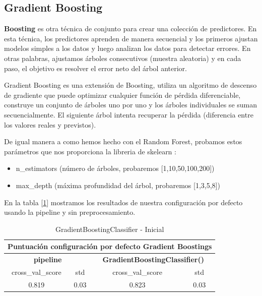 \documentclass[12pt,twoside]{report}
\begin{document}
\subsection*{Gradient Boosting}
\textbf{Boosting} es otra técnica de conjunto para crear una colección de predictores. En esta técnica, los predictores aprenden de manera secuencial y los primeros ajustan modelos simples a los datos y luego analizan los datos para detectar errores. En otras palabras, ajustamos árboles consecutivos (muestra aleatoria) y en cada paso, el objetivo es resolver el error neto del árbol anterior. 

Gradient Boosting es una extensión de Boosting, utiliza un algoritmo de descenso de gradiente que puede optimizar cualquier función de pérdida diferenciable, construye un conjunto de árboles uno por uno y los árboles individuales se suman secuencialmente. El siguiente árbol intenta recuperar la pérdida (diferencia entre los valores reales y previstos).

De igual manera a como hemos hecho con el Random Forest, probamos estos parámetros que nos proporciona la libreria de skelearn \cite{gbc}:

\begin{itemize}
	\item n\_estimators (número de árboles, probaremos  [1,10,50,100,200])
	\item max\_depth (máxima profundidad del árbol, probaremos [1,3,5,8])
\end{itemize}

En la tabla [\ref{gbc:inicial}] mostramos los resultados de nuestra configuración por defecto usando la pipeline y sin preprocesamiento.

\begin{table}[h]
\begin{center}
  \begin{tabular}{|c|c|c|c|}
  \hline
    \multicolumn{4}{|c|}{\textbf{Puntuación configuración por defecto Gradient Boostings}} \\  
    \hline
    \multicolumn{2}{|c|}{\textbf{pipeline}} & \multicolumn{2}{|c|}{\textbf{GradientBoostingClassifier()}}\\    
    \hline
   cross\_val\_score & std & cross\_val\_score & std  \\ 
   \hline
0.819 & 0.03 &0.823 & 0.03  \\ 
\hline
  \end{tabular}
  \end{center}
\caption{GradientBoostingClassifier - Inicial}
\label{gbc:inicial}
\end{table}
\end{document}
